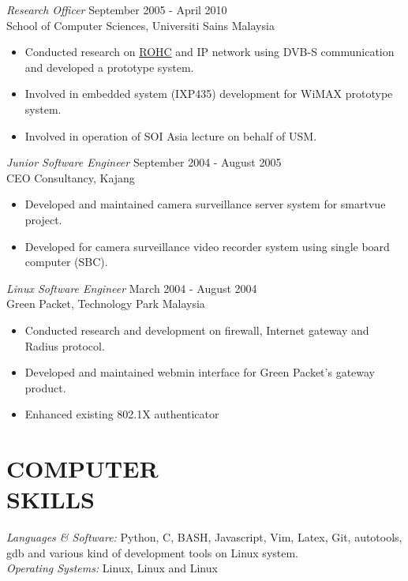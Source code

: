 \documentclass[margin]{res}
\begin{document}
\begin{resume}
                {\sl Research Officer} \hfill            September 2005 - April 2010 \\
                School of Computer Sciences, Universiti Sains Malaysia
                 \begin{itemize}  \itemsep -2pt %
		 \item Conducted research on \href{http://tools.ietf.org/html/rfc3095}{ROHC} and IP network using DVB-S communication
				 and developed a prototype system.
		 \item Involved in embedded system (IXP435) development for WiMAX prototype system.
		 \item Involved in operation of SOI Asia lecture on behalf of USM.
                 \end{itemize} 
                {\sl Junior Software Engineer} \hfill        September 2004 - August 2005 \\
                 CEO Consultancy, Kajang
                  \begin{itemize}
                   \item Developed and maintained camera surveillance server system for smartvue project.
	           \item Developed for camera surveillance video recorder system using single board computer (SBC).
                   \end{itemize} 
 		{\sl Linux Software Engineer} \hfill        March 2004 -  August 2004 \\
                 Green Packet, Technology Park Malaysia
                  \begin{itemize}
                   \item Conducted research and development on firewall, Internet gateway and Radius protocol.
	           \item Developed and maintained webmin interface for Green Packet's gateway product.
		   \item Enhanced existing 802.1X authenticator
                   \end{itemize} 
\section{COMPUTER \\ SKILLS} {\sl Languages \& Software:} Python, C, BASH, Javascript, Vim, Latex, Git, autotools, gdb and various kind of development tools on Linux system.\\
                {\sl Operating Systems:} Linux, Linux and Linux
	\end{resume} 
\end{document}

